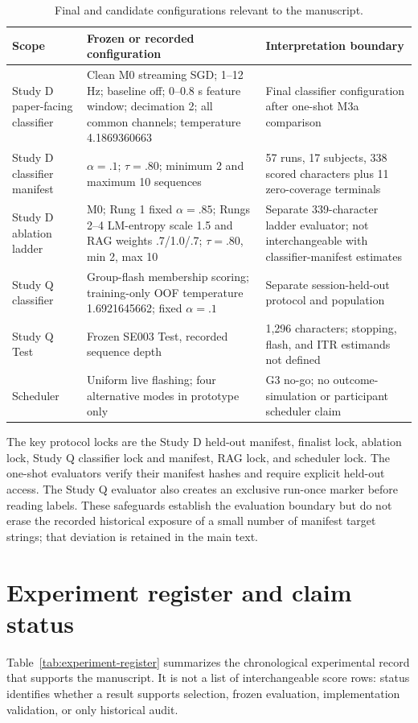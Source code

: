 \documentclass[final,5p,times,twocolumn,authoryear]{elsarticle}
\begin{document}
\begin{table}[t]
\centering\small
\caption{Final and candidate configurations relevant to the manuscript.}\label{tab:locks}
\begin{tabular}{p{}p{}p{}}
\toprule
Scope & Frozen or recorded configuration & Interpretation boundary\\
\midrule
Study D paper-facing classifier & Clean M0 streaming SGD; 1--12 Hz; baseline off; 0--0.8 s feature window; decimation 2; all common channels; temperature 4.1869360663 & Final classifier configuration after one-shot M3a comparison\\
Study D classifier manifest & $\alpha=.1$; $\tau=.80$; minimum 2 and maximum 10 sequences & 57 runs, 17 subjects, 338 scored characters plus 11 zero-coverage terminals\\
Study D ablation ladder & M0; Rung 1 fixed $\alpha=.85$; Rungs 2--4 LM-entropy scale 1.5 and RAG weights .7/1.0/.7; $\tau=.80$, min 2, max 10 & Separate 339-character ladder evaluator; not interchangeable with classifier-manifest estimates\\
Study Q classifier & Group-flash membership scoring; training-only OOF temperature 1.6921645662; fixed $\alpha=.1$ & Separate session-held-out protocol and population\\
Study Q Test & Frozen SE003 Test, recorded sequence depth & 1,296 characters; stopping, flash, and ITR estimands not defined\\
Scheduler & Uniform live flashing; four alternative modes in prototype only & G3 no-go; no outcome-simulation or participant scheduler claim\\
\bottomrule
\end{tabular}
\end{table}

The key protocol locks are the Study D held-out manifest, finalist lock, ablation lock, Study Q classifier lock and manifest, RAG lock, and scheduler lock. The one-shot evaluators verify their manifest hashes and require explicit held-out access. The Study Q evaluator also creates an exclusive run-once marker before reading labels. These safeguards establish the evaluation boundary but do not erase the recorded historical exposure of a small number of manifest target strings; that deviation is retained in the main text.

\section{Experiment register and claim status}
Table~\ref{tab:experiment-register} summarizes the chronological experimental record that supports the manuscript. It is not a list of interchangeable score rows: status identifies whether a result supports selection, frozen evaluation, implementation validation, or only historical audit.
\end{document}
